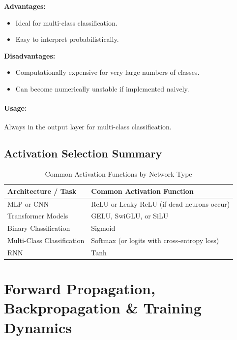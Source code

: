\begin{advbox}
\textbf{Advantages:}
\begin{itemize}
    \item Ideal for multi-class classification.
    \item Easy to interpret probabilistically.
\end{itemize}

\tcbline

\textbf{Disadvantages:}
\begin{itemize}
    \item Computationally expensive for very large numbers of classes.
    \item Can become numerically unstable if implemented naively.
\end{itemize}
\end{advbox}

\paragraph{Usage:} Always in the output layer for multi-class classification.

\subsection{Activation Selection Summary}

\begin{table}[h!]
\centering
\caption{Common Activation Functions by Network Type}
\begin{tabular}{ll}
\toprule
\textbf{Architecture / Task} & \textbf{Common Activation Function} \\
\midrule
MLP or CNN & ReLU or Leaky ReLU (if dead neurons occur) \\
Transformer Models & GELU, SwiGLU, or SiLU \\
Binary Classification & Sigmoid \\
Multi-Class Classification & Softmax (or logits with cross-entropy loss) \\
RNN & Tanh \\
\bottomrule
\end{tabular}
\end{table}

\clearpage

\section{Forward Propagation, Backpropagation \& Training Dynamics}

